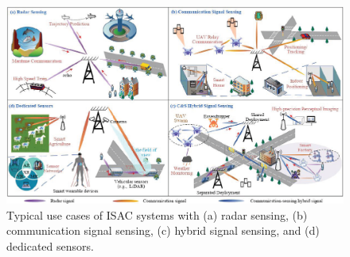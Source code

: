 \documentclass[journal,comsoc]{IEEEtran}
\begin{document}
\begin{figure}[t]
	\centering
	\includegraphics[width=17cm]{Use-Case-ISAC.eps}
	\caption{Typical use cases of ISAC systems with (a) radar sensing, (b) communication signal sensing, (c) hybrid signal sensing, and (d) dedicated sensors.}
	\label{fig:Use-Case-ISAC}
\end{figure}
\end{document}
